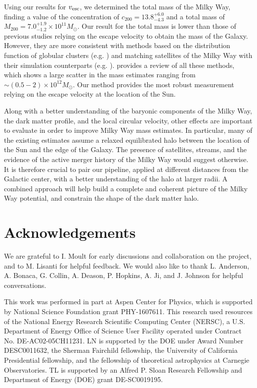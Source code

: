 \documentclass[twocolumn,preprintnumbers]{aastex63}
\newcommand{\vesc}{v_{\rm esc}}
\begin{document}
Using our results for $\vesc$, we determined the total mass of the Milky Way, finding a value of the concentration of $c_{200} = 13.8^{+6.0}_{-4.3}$ and a total mass of $M_{200} = 7.0^{+1.9}_{-1.2} \times 10^{11} M_{\odot}$. Our result for the total mass is lower than those of previous studies relying on the escape velocity to obtain the mass of the Galaxy. However, they are more consistent with methods based on the distribution function of globular clusters (e.g. \cite{2019ApJ...875..159E}) and matching satellites of the Milky Way with their simulation counterparts (e.g. \cite{2018ApJ...857...78P}). \cite{2020SCPMA..6309801W} provides a review of all these methods, which shows a large scatter in the mass estimates ranging from $\sim (0.5 - 2) \times 10^{12} M_{\odot}$.  Our method provides the most robust measurement relying on the escape velocity at the location of the Sun. 

Along with a better understanding of the baryonic components of the Milky Way, the dark matter profile, and the local circular velocity, other effects are important to evaluate in order to improve Milky Way mass estimates. In particular, many of the existing estimates assume a relaxed equilibrated halo between the location of the Sun and the edge of the Galaxy.
The presence of satellites, streams, and the evidence of the active merger history of the Milky Way would suggest otherwise. It is therefore crucial to pair our pipeline, applied at different distances from the Galactic center, with a better understanding of the halo at larger radii. A combined approach will help build a complete and coherent picture of the Milky Way potential, and constrain the shape of the dark matter halo.




\section*{Acknowledgements}

We are grateful to I. Moult for early discussions and collaboration on the project, and to M. Lisanti for helpful feedback.
We would also like to thank L. Anderson, A. Bonaca, G. Collin, A. Deason, P. Hopkins, A. Ji, and J. Johnson for helpful conversations.  

This work was performed in part at Aspen Center for Physics, which is supported by National Science Foundation grant PHY-1607611.
This research used resources of the National Energy Research Scientific Computing Center (NERSC), a U.S. Department of Energy Office of Science User Facility operated under Contract No. DE-AC02-05CH11231. 
LN is supported by the DOE under Award Number DESC0011632, the Sherman Fairchild fellowship, the University of California Presidential fellowship, and the fellowship of theoretical astrophysics at Carnegie Observatories.
TL is supported by an Alfred P. Sloan Research Fellowship and Department of Energy (DOE) grant DE-SC0019195.
\end{document}
